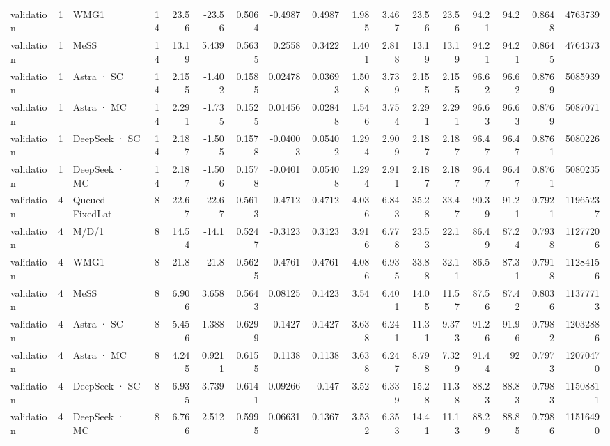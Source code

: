 \begin{tabular}{lrlrrrrrrrrrrrrrr}
validation & 1 & WMG1 & 14 & 23.56 & -23.56 & 0.5064 & -0.4987 & 0.4987 & 1.985 & 3.467 & 23.56 & 23.56 & 94.21 & 94.2 & 0.8648 & 4763739 \\
validation & 1 & MeSS & 14 & 13.19 & 5.439 & 0.5635 & 0.2558 & 0.3422 & 1.401 & 2.818 & 13.19 & 13.19 & 94.21 & 94.21 & 0.8645 & 4764373 \\
validation & 1 & Astra · SC & 14 & 2.155 & -1.402 & 0.1585 & 0.02478 & 0.03693 & 1.508 & 3.739 & 2.155 & 2.155 & 96.62 & 96.62 & 0.8769 & 5085939 \\
validation & 1 & Astra · MC & 14 & 2.291 & -1.735 & 0.1525 & 0.01456 & 0.02848 & 1.546 & 3.754 & 2.291 & 2.291 & 96.63 & 96.63 & 0.8769 & 5087071 \\
validation & 1 & DeepSeek · SC & 14 & 2.187 & -1.505 & 0.1578 & -0.04003 & 0.05402 & 1.294 & 2.909 & 2.187 & 2.187 & 96.47 & 96.47 & 0.8761 & 5080226 \\
validation & 1 & DeepSeek · MC & 14 & 2.187 & -1.506 & 0.1578 & -0.0401 & 0.05408 & 1.294 & 2.911 & 2.187 & 2.187 & 96.47 & 96.47 & 0.8761 & 5080235 \\
validation & 4 & Queued FixedLat & 8 & 22.67 & -22.67 & 0.5613 & -0.4712 & 0.4712 & 4.036 & 6.843 & 35.28 & 33.47 & 90.39 & 91.21 & 0.7921 & 11965237 \\
validation & 4 & M/D/1 & 8 & 14.54 & -14.1 & 0.5247 & -0.3123 & 0.3123 & 3.916 & 6.778 & 23.53 & 22.1 & 86.49 & 87.24 & 0.7938 & 11277206 \\
validation & 4 & WMG1 & 8 & 21.8 & -21.8 & 0.5625 & -0.4761 & 0.4761 & 4.086 & 6.935 & 33.88 & 32.11 & 86.5 & 87.31 & 0.7918 & 11284156 \\
validation & 4 & MeSS & 8 & 6.906 & 3.658 & 0.5643 & 0.08125 & 0.1423 & 3.54 & 6.401 & 14.05 & 11.57 & 87.56 & 87.42 & 0.8036 & 11377713 \\
validation & 4 & Astra · SC & 8 & 5.456 & 1.388 & 0.6299 & 0.1427 & 0.1427 & 3.638 & 6.241 & 11.31 & 9.373 & 91.26 & 91.96 & 0.7982 & 12032886 \\
validation & 4 & Astra · MC & 8 & 4.245 & 0.9211 & 0.6155 & 0.1138 & 0.1138 & 3.638 & 6.247 & 8.798 & 7.329 & 91.44 & 92 & 0.7973 & 12070470 \\
validation & 4 & DeepSeek · SC & 8 & 6.935 & 3.739 & 0.6141 & 0.09266 & 0.147 & 3.52 & 6.339 & 15.28 & 11.38 & 88.23 & 88.83 & 0.7983 & 11508811 \\
validation & 4 & DeepSeek · MC & 8 & 6.766 & 2.512 & 0.5995 & 0.06631 & 0.1367 & 3.532 & 6.353 & 14.41 & 11.13 & 88.29 & 88.85 & 0.7986 & 11516490 \\

\end{tabular}
